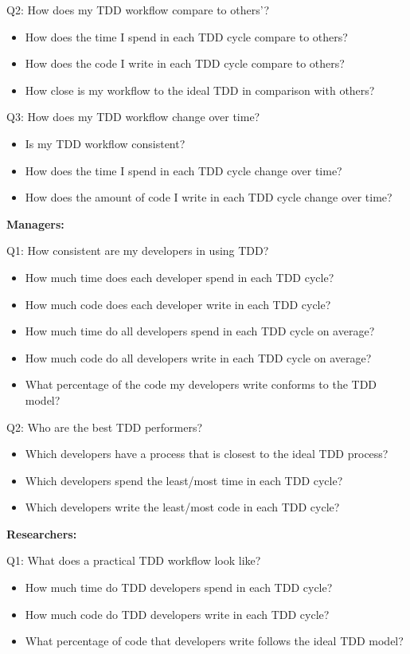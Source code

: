 \documentclass[journal]{vgtc}                %
\begin{document}
Q2: How does my TDD workflow compare to others'?
\begin{itemize}
	\item How does the time I spend in each TDD cycle compare to others?
	\item How does the code I write in each TDD cycle compare to others?
	\item How close is my workflow to the ideal TDD in comparison with others?
\end{itemize}

Q3: How does my TDD workflow change over time?
\begin{itemize}
	\item Is my TDD workflow consistent?
	\item How does the time I spend in each TDD cycle change over time?
	\item How does the amount of code I write in each TDD cycle change over time?
\end{itemize}

\noindent\textbf{Managers:} 

Q1: How consistent are my developers in using TDD?
\begin{itemize}
	\item How much time does each developer spend in each TDD cycle?
	\item How much code does each developer write in each TDD cycle?
	\item How much time do all developers spend in each TDD cycle on average?
	\item How much code do all developers write in each TDD cycle on average?
	\item What percentage of the code my developers write conforms to the TDD model?
\end{itemize}

Q2: Who are the best TDD performers? 
\begin{itemize}
	\item Which developers have a process that is closest to the ideal TDD process?
	\item Which developers spend the least/most time in each TDD cycle?
	\item Which developers write the least/most code in each TDD cycle?
\end{itemize}
	
\noindent\textbf{Researchers:}

Q1: What does a practical TDD workflow look like?
\begin{itemize}
	\item How much time do TDD developers spend in each TDD cycle?
	\item How much code do TDD developers write in each TDD cycle?
	\item What percentage of code that developers write follows the ideal TDD model?
\end{itemize}
	
\end{document}
